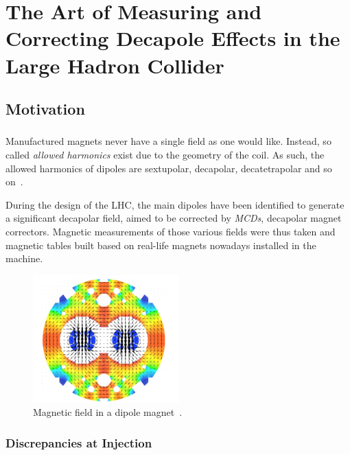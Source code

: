 \chapter{The Art of Measuring and Correcting Decapole Effects in the Large Hadron Collider}
\thumbforchapter{}
\chaptertoc{}
\newpage

\section{Motivation}

\subsection{}

Manufactured magnets never have a single field as one would like. Instead, so called 
\textit{allowed harmonics} exist due to the geometry of the coil. As such, the allowed harmonics of
dipoles are sextupolar, decapolar, decatetrapolar and so on~\cite{deniau_magnetic_2009}.

During the design of the LHC, the main dipoles have been identified to generate a significant 
decapolar field, aimed to be corrected by \textit{MCDs}, decapolar magnet correctors.
Magnetic measurements of those various fields were thus taken and magnetic tables built based on
real-life magnets nowadays installed in the machine.

\begin{figure}[H]
    \centering
    \includegraphics[width=0.5\textwidth]{./images/main_dipole_fields.png}
    \caption{Magnetic field in a dipole magnet~\cite{deniau_magnetic_2009}.}
    \label{fig:decapoles:magnetic_field_dipole}
\end{figure}


\subsection{Discrepancies at Injection}

